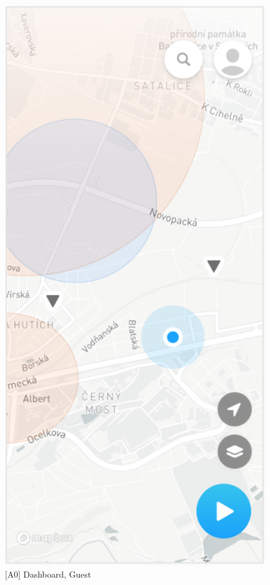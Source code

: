 \begin{figure}
    \centering
    \begin{minipage}{.45\textwidth}
        \centering
        \includegraphics[width=.7\linewidth]{assets/user_interface_design/dashboard/dashboard_guest.png}
        \caption{[A0] Dashboard, Guest}
        \label{fig:dashboard_guest}
    \end{minipage}%
    \hspace{.05\linewidth}
    \begin{minipage}{.45\textwidth}
        \centering

\end{minipage}
\end{figure}

